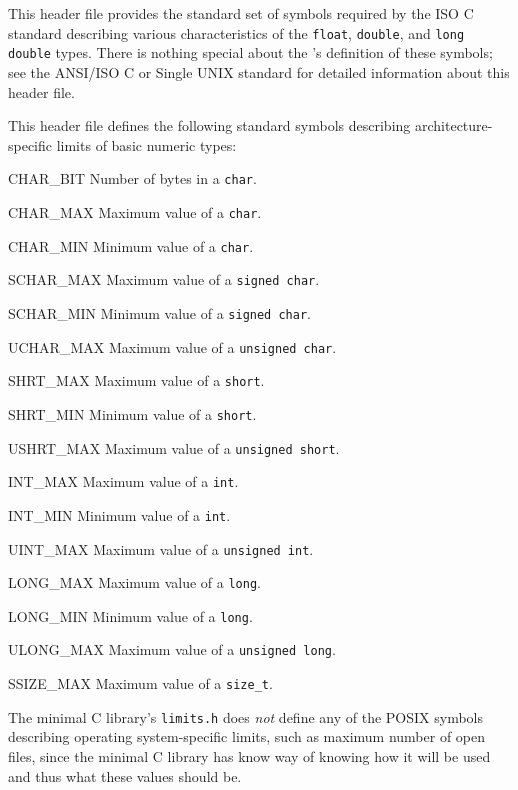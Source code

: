 \label{float-h}
\begin{apidesc}
	This header file provides
	the standard set of symbols required by the ISO C standard
	describing various characteristics
	of the \texttt{float}, \texttt{double}, and \texttt{long double} types.
	There is nothing special
	about the \oskit's definition of these symbols;
	see the ANSI/ISO C or Single UNIX standard
	for detailed information about this header file.
\end{apidesc}

\label{limits-h}
\begin{apidesc}
	This header file defines the following standard symbols
	describing architecture-specific limits of basic numeric types:
	\begin{icsymlist}
	\item[CHAR_BIT]
		Number of bytes in a \texttt{char}.
	\item[CHAR_MAX]
		Maximum value of a \texttt{char}.
	\item[CHAR_MIN]
		Minimum value of a \texttt{char}.
	\item[SCHAR_MAX]
		Maximum value of a \texttt{signed char}.
	\item[SCHAR_MIN]
		Minimum value of a \texttt{signed char}.
	\item[UCHAR_MAX]
		Maximum value of a \texttt{unsigned char}.
	\item[SHRT_MAX]
		Maximum value of a \texttt{short}.
	\item[SHRT_MIN]
		Minimum value of a \texttt{short}.
	\item[USHRT_MAX]
		Maximum value of a \texttt{unsigned short}.
	\item[INT_MAX]
		Maximum value of a \texttt{int}.
	\item[INT_MIN]
		Minimum value of a \texttt{int}.
	\item[UINT_MAX]
		Maximum value of a \texttt{unsigned int}.
	\item[LONG_MAX]
		Maximum value of a \texttt{long}.
	\item[LONG_MIN]
		Minimum value of a \texttt{long}.
	\item[ULONG_MAX]
		Maximum value of a \texttt{unsigned long}.
	\item[SSIZE_MAX]
		Maximum value of a \texttt{size_t}.
	\end{icsymlist}

	The minimal C library's \texttt{limits.h}
	does \emph{not} define any of the POSIX symbols
	describing operating system-specific limits,
	such as maximum number of open files,
	since the minimal C library has know way of knowing
	how it will be used and thus what these values should be.
\end{apidesc}

